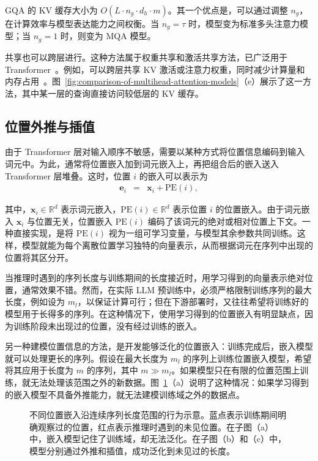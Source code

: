 \noindent GQA 的 KV 缓存大小为 $O(L \cdot n_g \cdot d_h \cdot m)$。其一个优点是，可以通过调整 $n_g$，在计算效率与模型表达能力之间权衡。当 $n_g = \tau$ 时，模型变为标准多头注意力模型；当 $n_g = 1$ 时，则变为 MQA 模型。

共享也可以跨层进行。这种方法属于权重共享和激活共享方法，已广泛用于 Transformer~\cite{dehghani-etal:2018universal,lan-etal:2020albert}。例如，可以跨层共享 KV 激活或注意力权重，同时减少计算量和内存占用~\cite{xiao-etal:2019sharing,brandon-etal:2024reducing}。图~\ref{fig:comparison-of-multihead-attention-models}（e）展示了这一方法，其中某一层的查询直接访问较低层的 KV 缓存。

\subsection{位置外推与插值}

\noindent 由于 Transformer 层对输入顺序不敏感，需要以某种方式将位置信息编码到输入词元中。为此，通常将位置嵌入加到词元嵌入上，再把组合后的嵌入送入 Transformer 层堆叠。这时，位置 $i$ 的嵌入可以表示为
\begin{eqnarray}
\mathbf{e}_i & = & \mathbf{x}_i + \mathrm{PE}(i) \label{eq:long-context-pe-base},
\end{eqnarray}

\noindent 其中，$\mathbf{x}_i \in \mathbb{R}^{d}$ 表示词元嵌入，$\mathrm{PE}(i) \in \mathbb{R}^{d}$ 表示位置 $i$ 的位置嵌入。由于词元嵌入 $\mathbf{x}_i$ 与位置无关，位置嵌入 $\mathrm{PE}(i)$ 编码了该词元的绝对或相对位置上下文。一种直接实现，是将 $\mathrm{PE}(i)$ 视为一组可学习变量，与模型其余参数共同训练。这样，模型就能为每个离散位置学习独特的向量表示，从而根据词元在序列中出现的位置将其区分开。

当推理时遇到的序列长度与训练期间的长度接近时，用学习得到的向量表示绝对位置，通常效果不错。然而，在实际 LLM 预训练中，必须严格限制训练序列的最大长度，例如设为 $m_l$，以保证计算可行；但在下游部署时，又往往希望将训练好的模型用于长得多的序列。在这种情况下，使用学习得到的位置嵌入有明显缺点，因为训练阶段未出现过的位置，没有经过训练的嵌入。

另一种建模位置信息的方法，是开发能够泛化的位置嵌入：训练完成后，嵌入模型就可以处理更长的序列。假设在最大长度为 $m_l$ 的序列上训练位置嵌入模型，希望将其应用于长度为 $m$ 的序列，其中 $m \gg m_l$。如果模型只在有限的位置范围上训练，就无法处理该范围之外的新数据。图~\ref{fig:pe-for-a-range-of-positions}（a）说明了这种情况：如果学习得到的嵌入模型不具备外推能力，就无法建模训练域之外的数据点。

\begin{figure}[!t]
\centering

\caption{不同位置嵌入沿连续序列长度范围的行为示意。蓝点表示训练期间明确观察过的位置，红点表示推理时遇到的未见位置。在子图（a）中，嵌入模型记住了训练域，却无法泛化。在子图（b）和（c）中，模型分别通过外推和插值，成功泛化到未见过的长度。}
\label{fig:pe-for-a-range-of-positions}
\end{figure}

